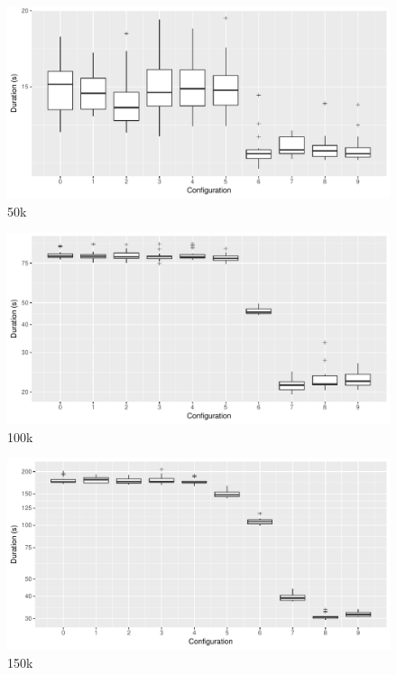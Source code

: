 \begin{figure}[htb]
        \includegraphics[width=\textwidth,keepaspectratio]{gfx/mean-durations-50k.pdf}
        \caption{50k}
        \label{fig:evaluation:performance:mean-durations-50k}
\end{figure}

\begin{figure}[htb]
        \includegraphics[width=\textwidth,keepaspectratio]{gfx/mean-durations-100k.pdf}
        \caption{100k}
        \label{fig:evaluation:performance:mean-durations-100k}
\end{figure}

\begin{figure}[htb]
        \includegraphics[width=\textwidth,keepaspectratio]{gfx/mean-durations-150k.pdf}
        \caption{150k}
        \label{fig:evaluation:performance:mean-durations-150k}
\end{figure}

